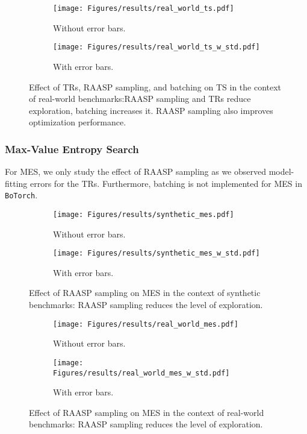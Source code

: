 \documentclass[accepted]{uai2025}
\begin{document}
\begin{figure}[H]
    \centering
    \begin{subfigure}{0.48\linewidth}
    \texttt{[image: Figures/results/real\_world\_ts.pdf]}
    \caption{Without error bars.}
    \end{subfigure}
    \begin{subfigure}{0.48\linewidth}
    \texttt{[image: Figures/results/real\_world\_ts\_w\_std.pdf]}
    \caption{With error bars.}
    \end{subfigure}
    \caption{Effect of \acp{TR}, \ac{RAASP} sampling, and batching on \ac{TS} in the context of real-world benchmarks:\ac{RAASP} sampling and \acp{TR} reduce exploration, batching increases it. \ac{RAASP} sampling also improves optimization performance.}
\end{figure}

\subsubsection{Max-Value Entropy Search}

For \ac{MES}, we only study the effect of \ac{RAASP} sampling as we observed model-fitting errors for the \acp{TR}.
Furthermore, batching is not implemented for \ac{MES} in \texttt{BoTorch}.

\begin{figure}[H]
    \centering
    \begin{subfigure}{0.48\linewidth}
    \texttt{[image: Figures/results/synthetic\_mes.pdf]}
    \caption{Without error bars.}
    \end{subfigure}
    \begin{subfigure}{0.48\linewidth}
    \texttt{[image: Figures/results/synthetic\_mes\_w\_std.pdf]}
    \caption{With error bars.}
    \end{subfigure}
    \caption{Effect of \ac{RAASP} sampling on \ac{MES} in the context of synthetic benchmarks: \ac{RAASP} sampling reduces the level of exploration.}
\end{figure}

\begin{figure}[H]
    \centering
    \begin{subfigure}{0.48\linewidth}
    \texttt{[image: Figures/results/real\_world\_mes.pdf]}
    \caption{Without error bars.}
    \end{subfigure}
    \begin{subfigure}{0.48\linewidth}
    \texttt{[image: Figures/results/real\_world\_mes\_w\_std.pdf]}
    \caption{With error bars.}
    \end{subfigure}
    \caption{Effect of \ac{RAASP} sampling on \ac{MES} in the context of real-world benchmarks: 
    \ac{RAASP} sampling reduces the level of exploration.}
\end{figure}
\end{document}

